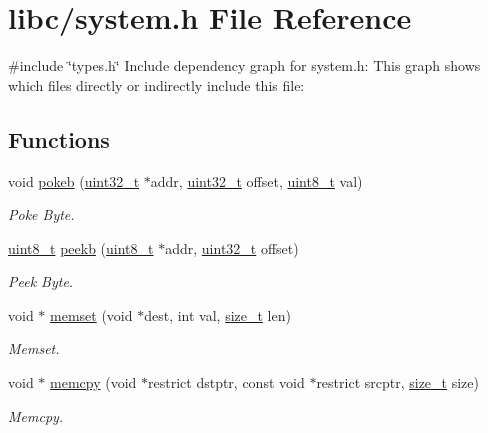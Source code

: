 \hypertarget{a00092}{}\section{libc/system.h File Reference}
\label{a00092}
{\ttfamily \#include \char`\"{}types.\+h\char`\"{}}\newline
Include dependency graph for system.\+h\+:
This graph shows which files directly or indirectly include this file\+:
\subsection*{Functions}
\begin{DoxyCompactItemize}
\item 
void \hyperlink{a00092_aa291c9926b84df379482632e80ec7c47_aa291c9926b84df379482632e80ec7c47}{pokeb} (\hyperlink{a00095_a435d1572bf3f880d55459d9805097f62_a435d1572bf3f880d55459d9805097f62}{uint32\+\_\+t} $\ast$addr, \hyperlink{a00095_a435d1572bf3f880d55459d9805097f62_a435d1572bf3f880d55459d9805097f62}{uint32\+\_\+t} offset, \hyperlink{a00095_aba7bc1797add20fe3efdf37ced1182c5_aba7bc1797add20fe3efdf37ced1182c5}{uint8\+\_\+t} val)
\begin{DoxyCompactList}\small\item\em Poke Byte. \end{DoxyCompactList}\item 
\hyperlink{a00095_aba7bc1797add20fe3efdf37ced1182c5_aba7bc1797add20fe3efdf37ced1182c5}{uint8\+\_\+t} \hyperlink{a00092_a353956c1fd65c7ed787836534fc9354e_a353956c1fd65c7ed787836534fc9354e}{peekb} (\hyperlink{a00095_aba7bc1797add20fe3efdf37ced1182c5_aba7bc1797add20fe3efdf37ced1182c5}{uint8\+\_\+t} $\ast$addr, \hyperlink{a00095_a435d1572bf3f880d55459d9805097f62_a435d1572bf3f880d55459d9805097f62}{uint32\+\_\+t} offset)
\begin{DoxyCompactList}\small\item\em Peek Byte. \end{DoxyCompactList}\item 
void $\ast$ \hyperlink{a00092_a9e432f267691eceb2e2e0efcc37efbc9_a9e432f267691eceb2e2e0efcc37efbc9}{memset} (void $\ast$dest, int val, \hyperlink{a00095_a29d85914ddff32967d85ada69854206d_a29d85914ddff32967d85ada69854206d}{size\+\_\+t} len)
\begin{DoxyCompactList}\small\item\em Memset. \end{DoxyCompactList}\item 
void $\ast$ \hyperlink{a00092_a113a42d20ee587a79f71464089007387_a113a42d20ee587a79f71464089007387}{memcpy} (void $\ast$restrict dstptr, const void $\ast$restrict srcptr, \hyperlink{a00095_a29d85914ddff32967d85ada69854206d_a29d85914ddff32967d85ada69854206d}{size\+\_\+t} size)
\begin{DoxyCompactList}\small\item\em Memcpy. \end{DoxyCompactList}\end{DoxyCompactItemize}


